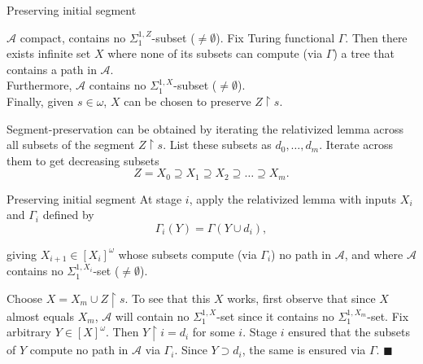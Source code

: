\begin{frame}{Preserving initial segment}
  \begin{main-lemma*}
    $\mathcal{A}$ compact, contains no $\Sigma_1^{1,Z}$-subset
    ($\neq\emptyset$). Fix Turing functional $\Gamma$. Then there exists
    infinite set $X$ where none of its subsets can compute (via $\Gamma$) a
    tree that contains a path in $\mathcal{A}$.\\
    \vspace{0.5em}
    Furthermore, $\mathcal{A}$ contains no $\Sigma_1^{1,X}$-subset
    ($\neq\emptyset$).\\
    \vspace{0.5em}
    Finally, given $s\in\omega$, $X$ can be chosen to preserve
    $Z\restriction s$.
  \end{main-lemma*}

  \vspace{0.5em}
  Segment-preservation can be obtained by iterating the relativized lemma
  across all subsets of the segment $Z\restriction s$. List these subsets
  as $d_0,\ldots,d_m$. Iterate across them to get decreasing subsets
  \[Z=X_0 \supseteq X_1 \supseteq X_2 \supseteq\ldots \supseteq X_m.\]
\end{frame}

\begin{frame}{Preserving initial segment}
  At stage $i$, apply the relativized lemma with inputs $X_i$ and
  $\Gamma_i$ defined by
  \[\Gamma_i(Y) =\Gamma(Y\cup d_i),\]

  giving $X_{i+1}\in[X_i]^\omega$ whose subsets compute (via
  $\Gamma_i$) no path in $\mathcal{A}$, and where $\mathcal{A}$ contains no
  $\Sigma_1^{1,X_i}$-set ($\neq\emptyset$).

  \vspace{0.5em}
  Choose $X=X_m\cup Z\restriction s$. To see that this $X$ works, first
  observe that since $X$ almost equals $X_m$, $\mathcal{A}$ will
  contain no $\Sigma_1^{1,X}$-set since it contains no
  $\Sigma_1^{1,X_m}$-set. Fix arbitrary $Y\in[X]^\omega$. Then
  $Y\restriction i=d_i$ for some $i$. Stage $i$ ensured that the subsets of
  $Y$ compute no path in $\mathcal{A}$ via $\Gamma_i$. Since $Y\supset
  d_i$, the same is ensured via $\Gamma$. $\blacksquare$
\end{frame}

